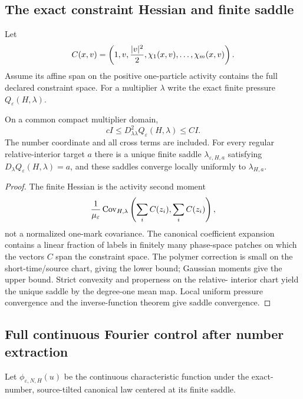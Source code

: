\subsection{The exact constraint Hessian and finite saddle}

Let
\[
 C(x,v)=\left(1,v,{|v|^2\over2},\chi_1(x,v),\ldots,\chi_m(x,v)\right).
\]
Assume its affine span on the positive one-particle activity contains the
full declared constraint space.  For a multiplier $\lambda$ write the exact
finite pressure $Q_\varepsilon(H,\lambda)$.

\begin{lemma}
\label{lem:r13-b1-meanmap}
On a common compact multiplier domain,
\[
 cI\le D^2_{\lambda\lambda}Q_\varepsilon(H,\lambda)\le CI.
\]
The number coordinate and all cross terms are included.  For every regular
relative-interior target $a$ there is a unique finite saddle
$\lambda_{\varepsilon,H,a}$ satisfying
$D_\lambda Q_\varepsilon(H,\lambda)=a$, and these saddles converge locally
uniformly to $\lambda_{H,a}$.
\end{lemma}

\begin{proof}
The finite Hessian is the activity second moment
\[
 {1\over\mu_\varepsilon}
 \operatorname{Cov}_{H,\lambda}
 \left(\sum_i C(z_i),\sum_iC(z_i)\right),
\]
not a normalized one-mark covariance.  The canonical coefficient expansion
contains a linear fraction of labels in finitely many phase-space patches on
which the vectors $C$ span the constraint space.  The polymer correction is
small on the short-time/source chart, giving the lower bound; Gaussian moments
give the upper bound.  Strict convexity and properness on the relative-
interior chart yield the unique saddle by the degree-one mean map.  Local
uniform pressure convergence and the inverse-function theorem give saddle
convergence.
\end{proof}

\subsection{Full continuous Fourier control after number extraction}

Let $\phi_{\varepsilon,N,H}(u)$ be the continuous characteristic function
under the exact-number, source-tilted canonical law centered at its finite
saddle.


